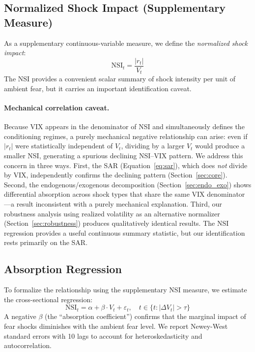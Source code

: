 \documentclass[12pt,a4paper]{article}
\begin{document}
\subsection{Normalized Shock Impact (Supplementary Measure)}

As a supplementary continuous-variable measure, we define the \textit{normalized shock impact}:
\begin{equation}
\text{NSI}_t = \frac{|r_t|}{V_t}
\label{eq:nsi}
\end{equation}
The NSI provides a convenient scalar summary of shock intensity per unit of ambient fear, but it carries an important identification caveat.

\paragraph{Mechanical correlation caveat.} Because VIX appears in the denominator of NSI and simultaneously defines the conditioning regimes, a purely mechanical negative relationship can arise: even if $|r_t|$ were statistically independent of $V_t$, dividing by a larger $V_t$ would produce a smaller NSI, generating a spurious declining NSI--VIX pattern. We address this concern in three ways. First, the SAR (Equation~\ref{eq:sar}), which does \textit{not} divide by VIX, independently confirms the declining pattern (Section~\ref{sec:core}). Second, the endogenous/exogenous decomposition (Section~\ref{sec:endo_exo}) shows differential absorption across shock types that share the same VIX denominator---a result inconsistent with a purely mechanical explanation. Third, our robustness analysis using realized volatility as an alternative normalizer (Section~\ref{sec:robustness}) produces qualitatively identical results. The NSI regression provides a useful continuous summary statistic, but our identification rests primarily on the SAR.

\subsection{Absorption Regression}

To formalize the relationship using the supplementary NSI measure, we estimate the cross-sectional regression:
\begin{equation}
\text{NSI}_t = \alpha + \beta \cdot V_t + \varepsilon_t, \quad t \in \{t : |\Delta V_t| > \tau\}
\label{eq:absorption_reg}
\end{equation}
A negative $\beta$ (the ``absorption coefficient'') confirms that the marginal impact of fear shocks diminishes with the ambient fear level. We report Newey-West standard errors with 10 lags to account for heteroskedasticity and autocorrelation.
\end{document}
